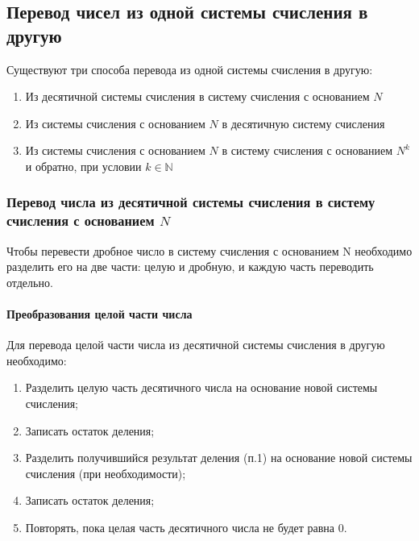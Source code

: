 \subsection{Перевод чисел из одной системы счисления в другую}\label{subsec:notation-conversion}

Существуют три способа перевода из одной системы счисления в другую:

\begin{enumerate}
    \item Из десятичной системы счисления в систему счисления с основанием $N$
    \item Из системы счисления с основанием $N$ в десятичную систему счисления
    \item Из системы счисления с основанием $N$ в систему счисления с основанием $N^{k}$ и обратно, при условии $k \in \mathbb{N}$
\end{enumerate}

\subsubsection{Перевод числа из десятичной системы счисления в систему счисления с основанием \texorpdfstring{$N$}{N}}\label{subsubsec:notation-conversion-10-to-n}

Чтобы перевести дробное число в систему счисления с основанием N необходимо разделить его на две части: целую и дробную, и каждую часть переводить отдельно.

\paragraph{Преобразования целой части числа}\label{par:notation-conversion-10-to-n-integer}
Для перевода целой части числа из десятичной системы счисления в другую необходимо:

\begin{enumerate}
    \item Разделить целую часть десятичного числа на основание новой системы счисления;
    \item Записать остаток деления;
    \item Разделить получившийся результат деления (п.1) на основание новой системы счисления (при необходимости);
    \item Записать остаток деления;
    \item Повторять, пока целая часть десятичного числа не будет равна 0.
\end{enumerate}


